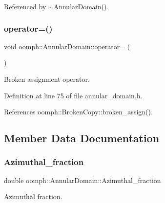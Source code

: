 Referenced by $\sim$\+Annular\+Domain().

\mbox{\label{classoomph_1_1AnnularDomain_a1e66e1208af0b6d0ec4a7006a77dbb5f}} 
\subsubsection{\texorpdfstring{operator=()}{operator=()}}
{\footnotesize\ttfamily void oomph\+::\+Annular\+Domain\+::operator= (\begin{DoxyParamCaption}\item[{const \hyperlink{classoomph_1_1AnnularDomain}{Annular\+Domain} \&}]{ }\end{DoxyParamCaption})\hspace{0.3cm}{\ttfamily [inline]}}



Broken assignment operator. 



Definition at line 75 of file annular\+\_\+domain.\+h.



References oomph\+::\+Broken\+Copy\+::broken\+\_\+assign().



\subsection{Member Data Documentation}
\mbox{\label{classoomph_1_1AnnularDomain_ac6ea648ff2b80c412c6aec3a071945af}} 
\subsubsection{\texorpdfstring{Azimuthal\+\_\+fraction}{Azimuthal\_fraction}}
{\footnotesize\ttfamily double oomph\+::\+Annular\+Domain\+::\+Azimuthal\+\_\+fraction\hspace{0.3cm}{\ttfamily [private]}}



Azimuthal fraction. 



